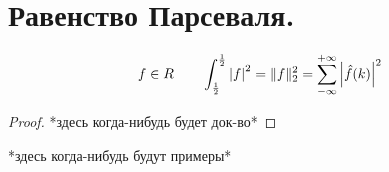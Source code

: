 \documentclass[matan]{subfiles}
\begin{document}
  \newpage
  \section{Равенство Парсеваля.}
  \begin{consequence}
    \[f \in R \qquad \int_{\frac{1}{2}}^{\frac{1}{2}} \left|f\right|^2 = \lVert f \rVert^2_2 = \sum_{-\infty}^{+\infty} \left|\hat{f}(k)\right|^2\]
  \end{consequence}

  \begin{proof}
    *здесь когда-нибудь будет док-во*
  \end{proof}

  \begin{examples}
    *здесь когда-нибудь будут примеры*
  \end{examples}
\end{document}
